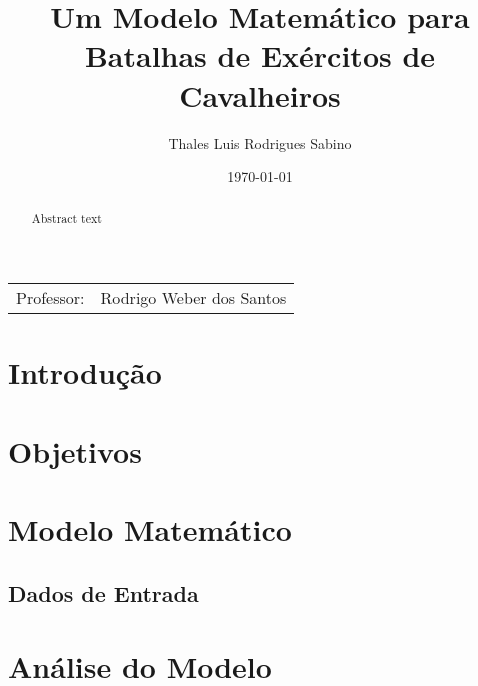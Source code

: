 \documentclass{article}
\title{Um Modelo Matemático para Batalhas de Exércitos de Cavalheiros} %
\author{Thales Luis Rodrigues Sabino} %
\date{\today} %
\begin{document}
\maketitle %

\begin{center}
\begin{tabular}{l r}
Professor: & Rodrigo Weber dos Santos %
\end{tabular}
\end{center}

\begin{abstract}
Abstract text
\end{abstract}


\section{Introdução}

\section{Objetivos}

\section{Modelo Matemático}

\subsection{Dados de Entrada}

\section{Análise do Modelo}






\end{document}
